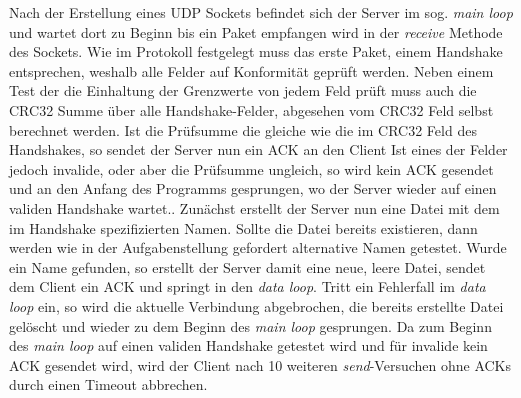 Nach der Erstellung eines UDP Sockets befindet sich der Server im sog. \textit{main loop} und wartet dort zu Beginn bis ein Paket empfangen wird in der \textit{receive} Methode des Sockets.
Wie im Protokoll festgelegt muss das erste Paket, einem Handshake entsprechen, weshalb alle Felder auf Konformität geprüft werden.
Neben einem Test der die Einhaltung der Grenzwerte von jedem Feld prüft muss auch die CRC32 Summe über alle Handshake-Felder, abgesehen vom CRC32 Feld selbst berechnet werden.
Ist die Prüfsumme die gleiche wie die im CRC32 Feld des Handshakes, so sendet der Server nun ein ACK an den Client
Ist eines der Felder jedoch invalide, oder aber die Prüfsumme ungleich, so wird kein ACK gesendet und an den Anfang des Programms gesprungen, wo der Server wieder auf einen validen Handshake wartet..
Zunächst erstellt der Server nun eine Datei mit dem im Handshake spezifizierten Namen.
Sollte die Datei bereits existieren, dann werden wie in der Aufgabenstellung gefordert alternative Namen getestet.
Wurde ein Name gefunden, so erstellt der Server damit eine neue, leere Datei, sendet dem Client ein ACK und springt in den \textit{data loop}.
Tritt ein Fehlerfall im \textit{data loop} ein, so wird die aktuelle Verbindung abgebrochen, die bereits erstellte Datei gelöscht und wieder zu dem Beginn des \textit{main loop} gesprungen.
Da zum Beginn des \textit{main loop} auf einen validen Handshake getestet wird und für invalide kein ACK gesendet wird, wird der Client nach 10 weiteren \textit{send}-Versuchen ohne ACKs durch einen Timeout abbrechen. \newline

